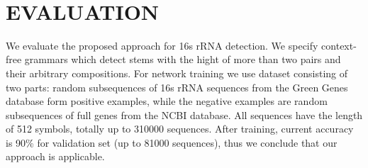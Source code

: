 \documentclass[a4paper,twoside]{article}
\begin{document}
{\centering
  \
  \
  }



\section{\uppercase{Evaluation}}
\label{sec:evaluation}

\noindent We evaluate the proposed approach for 16s rRNA detection.
We specify context-free grammars which detect stems with the hight of more than two pairs and their arbitrary compositions.
For network training we use dataset consisting of two parts: random subsequences of 16s rRNA sequences from the Green Genes database form positive examples, while the negative examples are random subsequences of full genes from the NCBI database.
All sequences have the length of 512 symbols, totally up to 310000 sequences.
After training, current accuracy is 90\% for validation set (up to 81000 sequences), thus we conclude that our approach is applicable.
\end{document}
